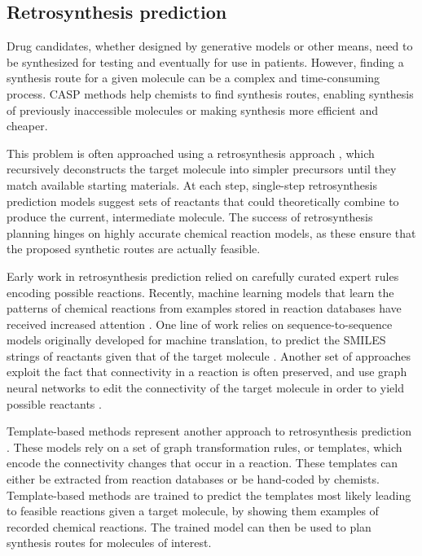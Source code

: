 \subsection{Retrosynthesis prediction}
Drug candidates, whether designed by generative models or other means, need to be
synthesized for testing and eventually for use in patients. However, finding a synthesis route for a
given molecule can be a complex and time-consuming process. \Ac{CASP} methods help
chemists to find synthesis routes, enabling synthesis of previously inaccessible molecules or making
synthesis more efficient and cheaper.

This problem is often approached using a retrosynthesis approach
\citep{coreyComputerAssistedDesignComplex1969,coreyLogicChemicalSynthesis1991a}, which
recursively deconstructs the target molecule into simpler precursors until they match available
starting materials. At each step, single-step retrosynthesis prediction models suggest sets of
reactants that could theoretically combine to produce the current, intermediate molecule.
The success of retrosynthesis planning hinges on highly accurate chemical reaction models, as these
ensure that the proposed synthetic routes are actually feasible.

Early work in retrosynthesis prediction relied on carefully curated expert rules  encoding possible
reactions. Recently, machine learning models that learn the patterns of chemical reactions from
examples stored in reaction databases have received increased attention
\citep{coleyMachineLearningComputerAided2018}. One line of work relies on sequence-to-sequence
models originally developed for machine translation, to predict the SMILES strings of reactants
given that of the target molecule
\citep{schwallerMolecularTransformerModel2019,namLinkingNeuralMachine2016,schwallerFoundTranslationPredicting2018,karpovTransformerModelRetrosynthesis2019,tetkoStateoftheartAugmentedNLP2020}.
Another set of approaches exploit the fact that connectivity in a reaction is often preserved, and
use graph neural networks to edit the connectivity of the target molecule in order to yield possible
reactants
\citep{sachaMoleculeEditGraph2020,shiGraphGraphsFramework2020,somnathLearningGraphModels2020,yanRetroXpertDecomposeRetrosynthesis2020}.

Template-based methods represent another approach to retrosynthesis prediction
\citep{seglerNeuralSymbolicMachineLearning2017,seglerPlanningChemicalSyntheses2018,daiRetrosynthesisPredictionConditional2020,sunEnergybasedViewRetrosynthesis2020}.
These models rely on a set of graph transformation rules, or templates, which encode the
connectivity changes that occur in a reaction. These templates can either be extracted from reaction
databases or be hand-coded by chemists. Template-based methods are trained to predict the templates
most likely leading to feasible reactions given a target molecule, by showing them examples of
recorded chemical reactions. The trained model can then be used to plan synthesis routes for
molecules of interest.

